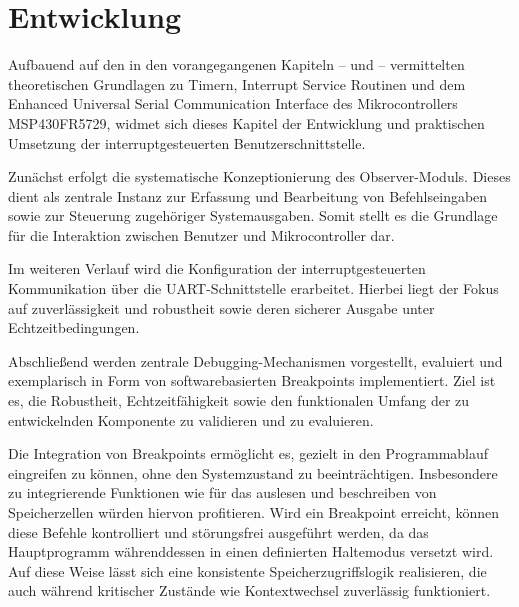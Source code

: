 

\chapter{Entwicklung}
\label{cha:Entwicklung}

Aufbauend auf den in den vorangegangenen Kapiteln --  und  -- vermittelten theoretischen Grundlagen zu Timern, Interrupt Service Routinen und dem Enhanced Universal Serial Communication Interface des Mikrocontrollers MSP430FR5729, widmet sich dieses Kapitel der Entwicklung und praktischen Umsetzung der interruptgesteuerten Benutzerschnittstelle.

Zun\"achst erfolgt die systematische Konzeptionierung des \glqq{}Observer-Moduls\grqq{}. Dieses dient als zentrale Instanz zur Erfassung und Bearbeitung von Befehlseingaben sowie zur Steuerung zugeh\"origer Systemausgaben. Somit stellt es die Grundlage f\"ur die Interaktion zwischen Benutzer und Mikrocontroller dar.

Im weiteren Verlauf wird die Konfiguration der interruptgesteuerten Kommunikation \"uber die UART-Schnittstelle erarbeitet. Hierbei liegt der Fokus auf zuverl\"assigkeit und robustheit sowie deren sicherer Ausgabe unter Echtzeitbedingungen.

Abschlie{\ss}end werden zentrale Debugging-Mechanismen vorgestellt, evaluiert und exemplarisch in Form von softwarebasierten Breakpoints implementiert. Ziel ist es, die Robustheit, Echtzeitf\"ahigkeit sowie den funktionalen Umfang der zu entwickelnden Komponente zu validieren und zu evaluieren.

Die Integration von Breakpoints erm\"oglicht es, gezielt in den Programmablauf eingreifen zu k\"onnen, ohne den Systemzustand zu beeintr\"achtigen. Insbesondere zu integrierende Funktionen wie \zB f\"ur das auslesen und beschreiben von Speicherzellen w\"urden hiervon profitieren. Wird ein Breakpoint erreicht, k\"onnen diese Befehle kontrolliert und st\"orungsfrei ausgef\"uhrt werden, da das Hauptprogramm w\"ahrenddessen in einen definierten Haltemodus versetzt wird. Auf diese Weise l\"asst sich eine konsistente Speicherzugriffslogik realisieren, die auch w\"ahrend kritischer Zust\"ande wie Kontextwechsel zuverl\"assig funktioniert.\AI


